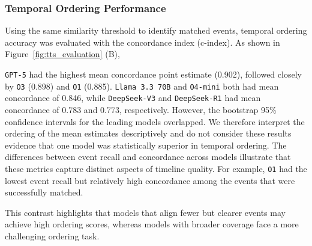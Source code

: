 \documentclass[pdflatex,sn-mathphys-num]{sn-jnl}%
\newif\ifshowrebuttalcolor
\newcommand{\rebuttal}[1]{%
  \ifshowrebuttalcolor
    \textcolor{rebuttalblue}{#1}%
  \else
    #1%
  \fi
}
\theoremstyle{thmstyleone}%
\theoremstyle{thmstyletwo}%
\theoremstyle{thmstylethree}%
\begin{document}
\subsubsection{Temporal Ordering Performance}
\label{sec:temporal-ordering-performance}

Using the same similarity threshold to identify matched events, temporal ordering accuracy was evaluated with the concordance index (c-index). As shown in Figure~\ref{fig:tts_evaluation} (B),
\rebuttal{
\texttt{GPT-5} had the highest mean concordance point estimate (0.902), followed closely by \texttt{O3} (0.898) and \texttt{O1} (0.885). \texttt{Llama 3.3 70B} and \texttt{O4-mini} both had mean concordance of 0.846, while \texttt{DeepSeek-V3} and \texttt{DeepSeek-R1} had mean concordance of 0.783 and 0.773, respectively. However, the bootstrap 95\% confidence intervals for the leading models overlapped. We therefore interpret the ordering of the mean estimates descriptively and do not consider these results evidence that one model was statistically superior in temporal ordering.
The differences between event recall and concordance across models illustrate that these metrics capture distinct aspects of timeline quality. For example, \texttt{O1} had the lowest event recall but relatively high concordance among the events that were successfully matched.
}
This contrast highlights that models that align fewer but clearer events may achieve high ordering scores, whereas models with broader coverage face a more challenging ordering task.
\end{document}
